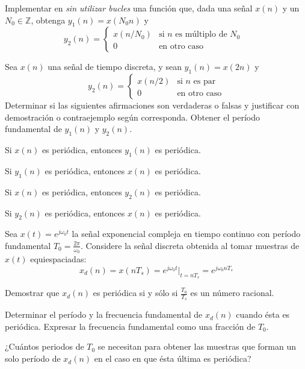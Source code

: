 \begin{ejercicio}
    Implementar en \Keyboardsym \emph{sin utilizar bucles} una función que, dada una señal $x(n)$ y un $N_0\in \mathbb{Z}$, obtenga $y_1(n)=x(N_0n)$ y 
    \begin{equation*}
    y_2(n) = \begin{cases}
    x(n/N_0) & \mbox{si $n$ es múltiplo de $N_0$ } \\
    0 & \mbox{en otro caso}
    \end{cases}
    \end{equation*}
\end{ejercicio}

\begin{ejercicio}
Sea $x(n)$ una señal de tiempo discreta, y sean $y_1(n) = x(2 n)$ y 
\begin{equation*}
y_2(n) = \begin{cases}
x(n/2) & \mbox{si $n$ es par} \\
0 & \mbox{en otro caso}
\end{cases}
\end{equation*}
Determinar si las siguientes afirmaciones son verdaderas o falsas y justificar con demostración o contraejemplo según corresponda. Obtener el período fundamental de $y_1(n)$ y $y_2(n)$.

\inciso Si $x(n)$ es periódica, entonces $y_1(n)$ es periódica.

\inciso Si $y_1(n)$ es periódica, entonces $x(n)$ es periódica.

\inciso Si $x(n)$ es periódica, entonces $y_2(n)$ es periódica.

\inciso Si $y_2(n)$ es periódica, entonces $x(n)$ es periódica.

\end{ejercicio}

\begin{ejercicio}
Sea $x(t)=e^{j\omega_0t}$ la señal exponencial compleja en tiempo continuo con período fundamental $T_0=\frac{2\pi}{\omega_0}$. Considere la señal discreta obtenida al tomar muestras de $x(t)$ equiespaciadas:
\begin{equation*}
    x_d(n) = x(nT_s) = e^{j\omega_0t}\big|_{t=nT_s} = e^{j\omega_0nT_s}
\end{equation*}

\inciso Demostrar que $x_d(n)$ es periódica si y sólo si $\frac{T_0}{T_s}$ es un número racional.

\inciso Determinar el período y la frecuencia fundamental de $x_d(n)$ cuando ésta es periódica. Expresar la frecuencia fundamental como una fracción de $T_0$.

\inciso ¿Cuántos periodos de $T_0$ se necesitan para obtener las muestras que forman un solo período de $x_d(n)$ en el caso en que ésta última es periódica?
\end{ejercicio}

